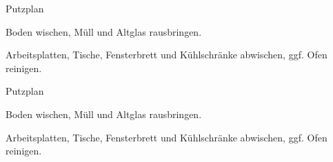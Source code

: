 \documentclass[landscape]{slides}
\begin{document}
\newcommand{\seite}{R}

\begin{center}
\Large Putzplan
\end{center}


\begin{tiny}
\begin{description}
    \setlength{\itemsep}{0pt}
    \item[Aufgabe 1] Boden wischen, Müll und Altglas rausbringen.
    \item[Aufgabe 2] Arbeitsplatten, Tische, Fensterbrett und Kühlschränke abwischen, ggf. Ofen reinigen.
\end{description}
\end{tiny}

\clearpage

\renewcommand{\seite}{S}

\begin{center}
\Large Putzplan
\end{center}


\begin{tiny}
\begin{description}
    \setlength{\itemsep}{0pt}
    \item[Aufgabe 1] Boden wischen, Müll und Altglas rausbringen.
    \item[Aufgabe 2] Arbeitsplatten, Tische, Fensterbrett und Kühlschränke abwischen, ggf. Ofen reinigen.
\end{description}
\end{tiny}
\end{document}
